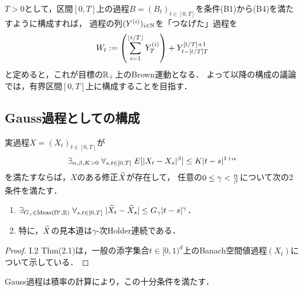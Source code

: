 \documentclass[uplatex,dvipdfmx]{jsreport}
\begin{document}
\begin{shishin}
    $T>0$として，区間$[0,T]$上の過程$B=(B_t)_{t\in[0,T]}$を条件(B1)から(B4)を満たすように構成すれば，
    過程の列$(Y^{(i)})_{i\in\mathbb{N}}$を「つなげた」過程を
    \[W_t:=\left(\sum^{\lfloor t/T\rfloor}_{i=1}Y_T^{(i)}\right)+Y^{[t/T]+1}_{t-[t/T]T}\]
    と定めると，これが目標の$\mathbb{R}_+$上のBrown運動となる．
    よって以降の構成の議論では，有界区間$[0,T]$上に構成することを目指す．
\end{shishin}

\subsection{Gauss過程としての構成}

\begin{theorem}\label{thm-Kolmogorov-continuity-criterion}
    実過程$X=(X_t)_{t\in[0,T]}$が
    \[\exists_{\alpha,\beta,K>0}\;\forall_{s,t\in[0,T]}\;E[\lvert X_{t}-X_s\rvert^\beta]\le K\lvert t-s\rvert^{1+\alpha}\]
    を満たすならば，$X$のある修正$\widetilde{X}$が存在して，
    任意の$0\le\gamma<\frac{\alpha}{\beta}$について次の2条件を満たす．
    \begin{enumerate}
        \item $\exists_{G_\gamma\in\mathrm{Meas}(\Omega',\mathbb{R})}\;\forall_{s,t\in[0,T]}\;\lvert\widetilde{X}_t-\widetilde{X}_s\rvert\le G_\gamma\lvert t-s\rvert^\gamma$．
        \item 特に，$\widetilde{X}$の見本道は$\gamma$-次Holder連続である．
    \end{enumerate}
\end{theorem}
\begin{proof}
    \cite{Revus and Yor}I.2 Thm(2.1)は，一般の添字集合$t\in[0,1)^d$上のBanach空間値過程$(X_t)$について示している．
\end{proof}
\begin{remarks}
    Gauss過程は積率の計算により，この十分条件を満たす．
\end{remarks}
\end{document}
